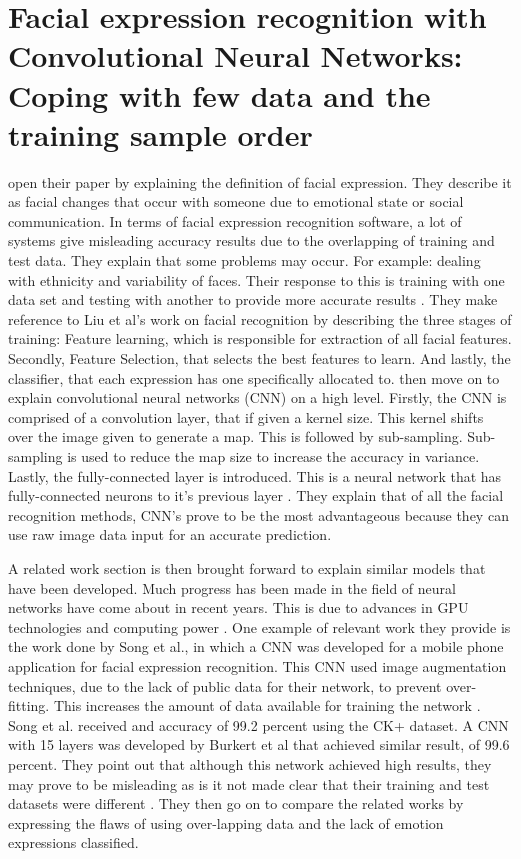 \section{Facial expression recognition with Convolutional Neural Networks: Coping with few data and the training sample order}
\citeauthor{LOPES} open their paper by explaining the definition of facial expression. They describe it as facial changes that occur with someone due to emotional state or social communication. In terms of facial expression recognition software, a lot of systems give misleading accuracy results due to the overlapping of training and test data. They explain that some problems may occur. For example: dealing with ethnicity and variability of faces. Their response to this is training with one data set and testing with another to provide more accurate results \citep{LOPES}. They make reference to Liu et al's work on facial recognition by describing the three stages of training: Feature learning, which is responsible for extraction of all facial features. Secondly, Feature Selection, that selects the best features to learn. And lastly, the classifier, that each expression has one specifically allocated to. \citeauthor{LOPES} then move on to explain convolutional neural networks (CNN) on a high level. Firstly, the CNN is comprised of a convolution layer, that if given a kernel size. This kernel shifts over the image given to generate a map. This is followed by sub-sampling. Sub-sampling is used to reduce the map size to increase the accuracy in variance. Lastly, the fully-connected layer is introduced. This is a neural network that has fully-connected neurons to it's previous layer \citep{LOPES}. They explain that of all the facial recognition methods, CNN's prove to be  the most advantageous because they can use raw image data input for an accurate prediction. 

A related work section is then brought forward to explain similar models that have been developed. Much progress has been made in the field of neural networks have come about in recent years. This is due to advances in GPU technologies and computing power \cite{LOPES}. One example of relevant work they provide is the work done by Song et al., in which a CNN was developed for a mobile phone application for facial expression recognition. This CNN used image augmentation techniques, due to the lack of public data for their network, to prevent over-fitting. This increases the amount of data available for training the network \citep{LOPES}. Song et al. received and accuracy of 99.2 percent using the CK+ dataset. A CNN with 15 layers was developed by Burkert et al that achieved similar result, of 99.6 percent. They point out that although this network achieved high results, they may prove to be misleading as is it not made clear that their training and test datasets were different \citep{LOPES}. They then go on to compare the related works by expressing the flaws of using over-lapping data and the lack of emotion expressions classified.  

